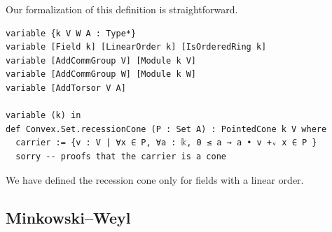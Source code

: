 Our formalization of this definition is straightforward.

\begin{lstlisting}
variable {k V W A : Type*}
variable [Field k] [LinearOrder k] [IsOrderedRing k]
variable [AddCommGroup V] [Module k V]
variable [AddCommGroup W] [Module k W]
variable [AddTorsor V A]

variable (k) in
def Convex.Set.recessionCone (P : Set A) : PointedCone k V where
  carrier := {v : V | ∀x ∈ P, ∀a : 𝕜, 0 ≤ a → a • v +ᵥ x ∈ P }
  sorry -- proofs that the carrier is a cone
\end{lstlisting}

We have defined the recession cone only for fields with a linear order.

\subsection{Minkowski--Weyl}
\label{subsec:mw:minkowski-weyl}

